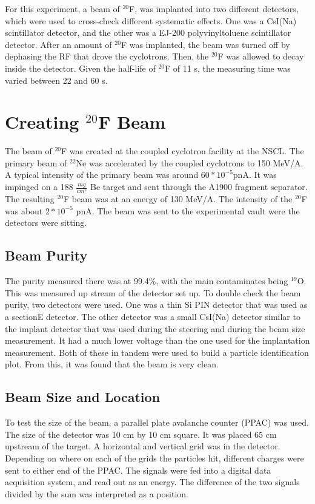 For this experiment, a  beam of  $^{20}$F, was implanted into two different detectors, which were used to cross-check different systematic effects.
One was a CsI(Na) scintillator detector, and the other was a  EJ-200 polyvinyltoluene scintillator detector. 
After an amount of $^{20}$F was implanted, the beam was turned off by dephasing the RF that drove the cyclotrons.
Then, the $^{20}$F was allowed to decay inside the detector. 
Given the half-life of $^{20}$F of 11 s, the measuring time was varied between 22 and 60 s.

\section{Creating $^{20}$F Beam}

The beam of $^{20}$F was created at the coupled cyclotron facility at the NSCL.
The primary beam of $^{22}$Ne was accelerated by the coupled cyclotrons to 150 MeV/A. 
A typical intensity of the primary beam was around $60 * 10^{-5}$pnA.
It was impinged on a 188 $\frac{mg}{cm^{2}}$ Be target and sent through the A1900 fragment separator. 
The resulting $^{20}$F beam was at an energy of 130 MeV/A. 
The intensity of the $^{20}$F was about $2 * 10^{-5}$ pnA.
The beam was sent to the experimental vault were the detectors were sitting.
\subsection{Beam Purity}

The purity measured there was at 99.4\%, with the main contaminates being  $^{19}$O. 
This was measured up stream of the detector set up.
To double check the beam purity, two detectors were used. 
One was a thin Si PIN detector that was used as a sectionE detector. 
The other detector was a small CsI(Na) detector similar to the implant detector that was used during the steering and during the beam size measurement. 
It had a much lower voltage than the one used for the implantation measurement. 
Both of these in tandem were used to build a particle identification plot.
From this, it was found that the beam is very clean.

\subsection{Beam Size and Location}
To test the size of the beam, a parallel plate avalanche counter (PPAC) was used.
The size of the detector was 10 cm by 10 cm square. 
It was placed 65 cm upstream of the target.
A horizontal and vertical grid was in the detector.
Depending on where on each of the grids the particles hit, different charges were sent to either end of the PPAC.
The signals were fed into a digital data acquisition system, and read out as an energy.
The difference of the two signals divided by the sum was interpreted as a position.

